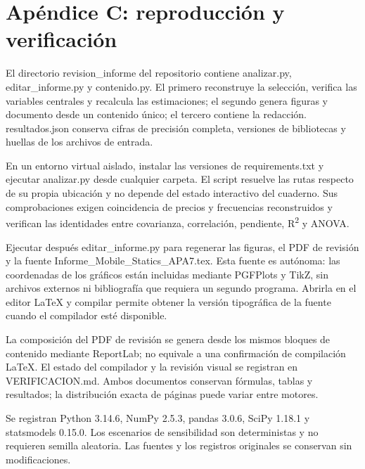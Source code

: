 \documentclass[12pt,letterpaper]{article}
\begin{document}
\section*{Apéndice C: reproducción y verificación}
El directorio revision\_informe del repositorio contiene analizar.py, editar\_informe.py y contenido.py. El primero reconstruye la selección, verifica las variables centrales y recalcula las estimaciones; el segundo genera figuras y documento desde un contenido único; el tercero contiene la redacción. resultados.json conserva cifras de precisión completa, versiones de bibliotecas y huellas de los archivos de entrada.

En un entorno virtual aislado, instalar las versiones de requirements.txt y ejecutar analizar.py desde cualquier carpeta. El script resuelve las rutas respecto de su propia ubicación y no depende del estado interactivo del cuaderno. Sus comprobaciones exigen coincidencia de precios y frecuencias reconstruidos y verifican las identidades entre covarianza, correlación, pendiente, R\textsuperscript{2} y ANOVA.

Ejecutar después editar\_informe.py para regenerar las figuras, el PDF de revisión y la fuente Informe\_Mobile\_Statics\_APA7.tex. Esta fuente es autónoma: las coordenadas de los gráficos están incluidas mediante PGFPlots y TikZ, sin archivos externos ni bibliografía que requiera un segundo programa. Abrirla en el editor LaTeX y compilar permite obtener la versión tipográfica de la fuente cuando el compilador esté disponible.

La composición del PDF de revisión se genera desde los mismos bloques de contenido mediante ReportLab; no equivale a una confirmación de compilación LaTeX. El estado del compilador y la revisión visual se registran en VERIFICACION.md. Ambos documentos conservan fórmulas, tablas y resultados; la distribución exacta de páginas puede variar entre motores.

Se registran Python 3.14.6, NumPy 2.5.3, pandas 3.0.6, SciPy 1.18.1 y statsmodels 0.15.0. Los escenarios de sensibilidad son deterministas y no requieren semilla aleatoria. Las fuentes y los registros originales se conservan sin modificaciones.
\end{document}
